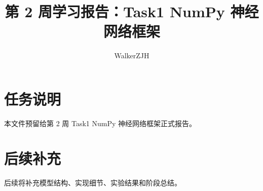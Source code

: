 \documentclass[UTF8]{ctexart}
\title{第 2 周学习报告：Task1 NumPy 神经网络框架}
\author{WalkerZJH}
\date{}
\begin{document}
\maketitle

\section{任务说明}

本文件预留给第 2 周 Task1 NumPy 神经网络框架正式报告。

\section{后续补充}

后续将补充模型结构、实现细节、实验结果和阶段总结。
\end{document}
